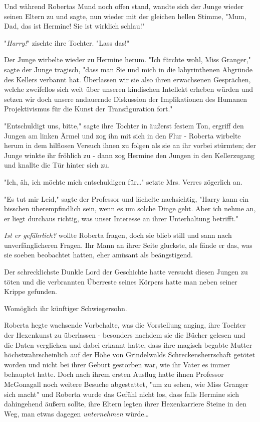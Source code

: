 {Und während Robertas Mund noch offen stand, wandte sich der Junge wieder seinen Eltern zu und sagte, nun wieder mit der gleichen hellen Stimme, "Mum, Dad, das ist Hermine! Sie ist wirklich schlau!"

"\emph{Harry!}" zischte ihre Tochter. "Lass das!"

Der Junge wirbelte wieder zu Hermine herum. "Ich fürchte wohl, Miss Granger," sagte der Junge tragisch, "dass man Sie und mich in die labyrinthenen Abgründe des Kellers verbannt hat. Überlassen wir sie also ihren erwachsenen Gesprächen, welche zweifellos sich weit über unseren kindischen Intellekt erheben würden und setzen wir doch unsere andauernde Diskussion der Implikationen des Humanen Projektivismus für die Kunst der Transfiguration fort."

"Entschuldigt uns, bitte," sagte ihre Tochter in äußerst festem Ton, ergriff den Jungen am linken Ärmel und zog ihn mit sich in den Flur - Roberta wirbelte herum in dem hilflosen Versuch ihnen zu folgen als sie an ihr vorbei stürmten; der Junge winkte ihr fröhlich zu - dann zog Hermine den Jungen in den Kellerzugang und knallte die Tür hinter sich zu.

"Ich, äh, ich möchte mich entschuldigen für…" setzte Mrs. Verres zögerlich an.

"Es tut mir Leid," sagte der Professor und lächelte nachsichtig, "Harry kann ein bisschen überempfindlich sein, wenn es um solche Dinge geht. Aber ich nehme an, er liegt durchaus richtig, was unser Interesse an ihrer Unterhaltung betrifft."

\emph{Ist er gefährlich?} wollte Roberta fragen, doch sie blieb still und sann nach unverfänglicheren Fragen. Ihr Mann an ihrer Seite gluckste, als fände er das, was sie soeben beobachtet hatten, eher amüsant als beängstigend.

Der schrecklichste Dunkle Lord der Geschichte hatte versucht diesen Jungen zu töten und die verbrannten Überreste seines Körpers hatte man neben seiner Krippe gefunden.

Womöglich ihr künftiger Schwiegersohn.

Roberta hegte wachsende Vorbehalte, was die Vorstellung anging, ihre Tochter der Hexenkunst zu überlassen - besonders nachdem sie die Bücher gelesen und die Daten verglichen und dabei erkannt hatte, dass ihre magisch begabte Mutter höchstwahrscheinlich auf der Höhe von Grindelwalds Schreckensherrschaft getötet worden und nicht bei ihrer Geburt gestorben war, wie ihr Vater es immer behauptet hatte. Doch nach ihrem ersten Ausflug hatte ihnen Professor McGonagall noch weitere Besuche abgestattet, "um zu sehen, wie Miss Granger sich macht" und Roberta wurde das Gefühl nicht los, dass falls Hermine sich dahingehend äußern sollte, ihre Eltern legten ihrer Hexenkarriere Steine in den Weg, man etwas dagegen \emph{unternehmen} würde…

}
